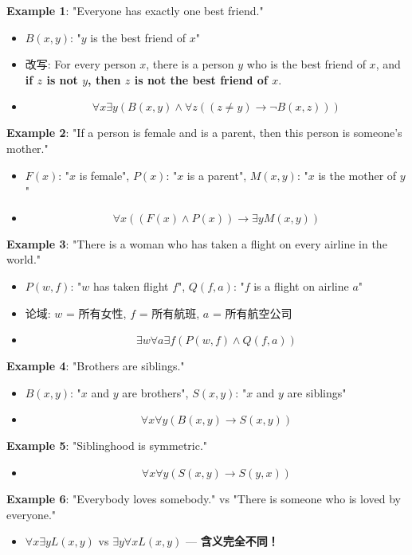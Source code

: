 \documentclass[10pt,a4paper,openany]{ctexbook}
\theoremstyle{definition}
\theoremstyle{remark}
\begin{document}
\textbf{Example 1}: "Everyone has exactly one best friend."
\begin{itemize}
\item $B(x,y)$: "$y$ is the best friend of $x$"
\item 改写: For every person $x$, there is a person $y$ who is the best friend of $x$, and \textbf{if $z$ is not $y$, then $z$ is not the best friend of $x$}.
\item $$\forall x \exists y (B(x,y) \land \forall z ((z \neq y) \to \neg B(x,z)))$$

\end{itemize}

\textbf{Example 2}: "If a person is female and is a parent, then this person is someone's mother."
\begin{itemize}
\item $F(x)$: "$x$ is female", $P(x)$: "$x$ is a parent", $M(x,y)$: "$x$ is the mother of $y$"
\item $$\forall x ((F(x) \land P(x)) \to \exists y M(x,y))$$

\end{itemize}

\textbf{Example 3}: "There is a woman who has taken a flight on every airline in the world."
\begin{itemize}
\item $P(w,f)$: "$w$ has taken flight $f$", $Q(f,a)$: "$f$ is a flight on airline $a$"
\item 论域: $w$ = 所有女性, $f$ = 所有航班, $a$ = 所有航空公司
\item $$\exists w \forall a \exists f (P(w,f) \land Q(f,a))$$

\end{itemize}

\textbf{Example 4}: "Brothers are siblings."
\begin{itemize}
\item $B(x,y)$: "$x$ and $y$ are brothers", $S(x,y)$: "$x$ and $y$ are siblings"
\item $$\forall x \forall y (B(x,y) \to S(x,y))$$

\end{itemize}

\textbf{Example 5}: "Siblinghood is symmetric."
\begin{itemize}
\item $$\forall x \forall y (S(x,y) \to S(y,x))$$

\end{itemize}

\textbf{Example 6}: "Everybody loves somebody." vs "There is someone who is loved by everyone."
\begin{itemize}
\item $\forall x \exists y L(x,y)$ vs $\exists y \forall x L(x,y)$ — \textbf{含义完全不同！}

\end{itemize}
\end{document}
